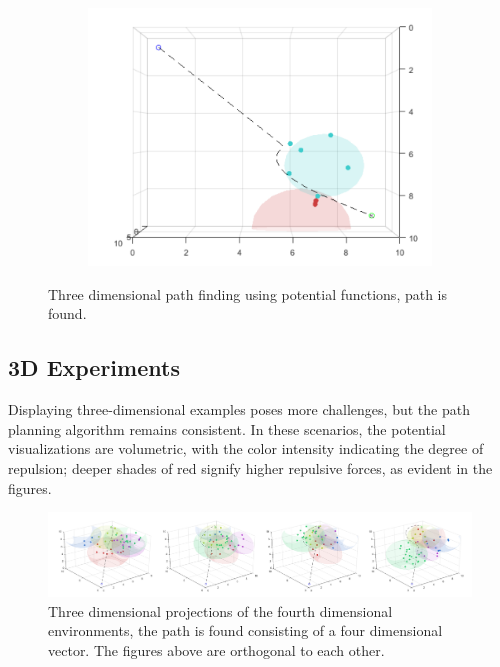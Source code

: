\documentclass{IEEEtaes}
\begin{document}
{\begin{figure}
\begin{subfigure}{0.33\textwidth}
    \caption{}
    \label{fig:figure2}
  \end{subfigure}%
  \hfill
  \begin{subfigure}{0.33\textwidth}
    \includegraphics[width=\linewidth]{three-2.pdf}
    \caption{}
    \label{fig:figure3}
  \end{subfigure}
  \caption{Three dimensional path finding using potential functions, path is found.}
\end{figure}
\subsection{3D Experiments}

Displaying three-dimensional examples poses more challenges, but the path planning algorithm remains consistent. In these scenarios, the potential visualizations are volumetric, with the color intensity indicating the degree of repulsion; deeper shades of red signify higher repulsive forces, as evident in the figures.


\begin{figure}
    \vspace{-1em}
    \begin{center}    
        \includegraphics[width=1\linewidth]{fourth.pdf}
    \end{center}
     \caption{Three dimensional projections of the fourth dimensional environments, the path is found consisting of a four dimensional vector. The figures above are orthogonal to each other.}
     \label{three}
\end{figure}

}
\end{document}
